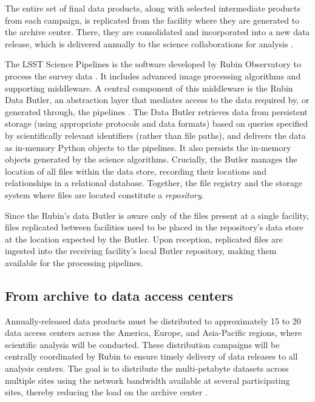 \documentclass{webofc}
\begin{document}
The entire set of final data products, along with selected intermediate products from each campaign, is replicated from the facility where they are generated to the archive center. There, they are consolidated and incorporated into a new data release, which is delivered annually to the science collaborations for analysis \cite{10.1051_epjconf_202429501042}.

The LSST Science Pipelines is the software developed by Rubin Observatory to process the survey data \cite{bosch-pipelines}. It includes advanced image processing algorithms and supporting middleware. A central component of this middleware is the Rubin Data Butler, an abstraction layer that mediates access to the data required by, or generated through, the pipelines \cite{2022SPIE12189E..11J}. The Data Butler retrieves data from persistent storage (using appropriate protocols and data formats) based on queries specified by scientifically relevant identifiers (rather than file paths), and delivers the data as in-memory Python objects to the pipelines. It also persists the in-memory objects generated by the science algorithms. Crucially, the Butler manages the location of all files within the data store, recording their locations and relationships in a relational database. Together, the file registry and the storage system where files are located constitute a \emph{repository}.

Since the Rubin's data Butler is aware only of the files present at a single facility, files replicated between facilities need to be placed in the repository's data store at the location expected by the Butler. Upon reception, replicated files are ingested into the receiving facility's local Butler repository, making them available for the processing pipelines.


\subsection{From archive to data access centers}
\label{summit-to-data-access-centers}

Annually-released data products must be distributed to approximately 15 to 20 data access centers across the America, Europe, and Asia-Pacific regions, where scientific analysis will be conducted. These distribution campaigns will be centrally coordinated by Rubin to ensure timely delivery of data releases to all analysis centers. The goal is to distribute the multi-petabyte datasets across multiple sites using the network bandwidth available at several participating sites, thereby reducing the load on the archive center \cite{RTN-086}.
\end{document}
